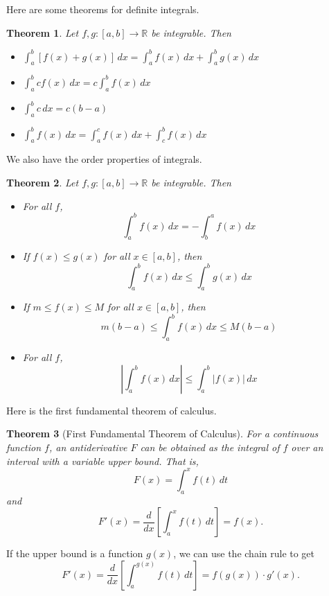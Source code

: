 \documentclass[11pt]{scrartcl}
\theoremstyle{plain}
\newtheorem{theorem}{Theorem}[section]
\theoremstyle{definition}
\theoremstyle{remark}
\begin{document}
Here are some theorems for definite integrals.

\begin{theorem}
    Let $f,g\colon[a,b]\to \mathbb{R}$ be integrable. Then
    \begin{itemize}
        \item $\int_{a}^{b} [f(x)+g(x)] \, dx = \int_{a}^{b} f(x) \, dx+\int_{a}^{b} g(x) \, dx$
        \item $\int_{a}^{b} cf(x) \, dx=c\int_{a}^{b} f(x) \, dx$
        \item $\int_{a}^{b} c \, dx=c(b-a)$
        \item $\int_{a}^{b} f(x) \, dx=\int_{a}^{c} f(x) \, dx+\int_{c}^{b} f(x) \, dx$
    \end{itemize} 
\end{theorem}

We also have the order properties of integrals. 

\begin{theorem}
    Let $f,g\colon[a,b]\to \mathbb{R}$ be integrable. Then
    \begin{itemize}
        \item For all $f$, 
        \[ \int_{a}^{b} f(x) \, dx =-\int_{b}^{a} f(x) \, dx  \]
        \item If $f(x)\leq g(x)$ for all $x \in[a,b]$, then 
        \[ \int_{a}^{b} f(x) \, dx \leq \int_{a}^{b} g(x) \, dx  \]
        \item If $m\leq f(x)\leq M$ for all $x \in[a,b]$, then
        \[ m(b-a)\leq \int_{a}^{b} f(x) \, dx \leq M(b-a) \]
        \item For all $f$,
        \[ \left\lvert  \int_{a}^{b} f(x) \, dx   \right\rvert \leq \int_{a}^{b} \lvert f(x) \rvert  \, dx  \]
    \end{itemize}
\end{theorem}

Here is the first fundamental theorem of calculus.

\begin{theorem}[First Fundamental Theorem of Calculus]
    For a continuous function $f$, an antiderivative $F$ can be obtained as the integral of $f$ over an interval with a variable upper bound. That is,
    \[ F(x)=\int_{a}^{x} f(t) \, dt  \]
    and
    \[ F'(x)=\frac{d}{dx}\left[ \int_{a}^{x} f(t) \, dt  \right]=f(x). \]
\end{theorem}

If the upper bound is a function $g(x)$, we can use the chain rule to get
\[ F'(x)=\frac{d}{dx}\left[ \int_{a}^{g(x)} f(t) \, dt  \right] = f(g(x))\cdot g'(x). \]
\end{document}
